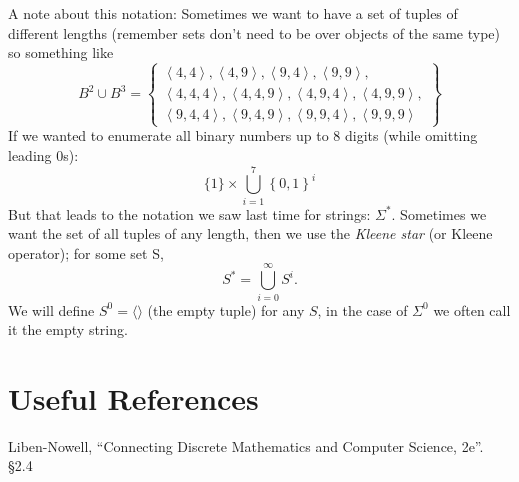 A note about this notation:
Sometimes we want to have a set of tuples of different lengths (remember sets don't need to be over objects of the same type) 
so something like 
\[
B^2 \cup B^3 = \left\{  \begin{matrix}\left\langle 4,4 \right\rangle, \left\langle 4,9 \right\rangle,  \left\langle 9,4 \right\rangle, \left\langle 9,9 \right\rangle,\\
				\left\langle 4,4,4 \right\rangle, \left\langle 4,4,9 \right\rangle,  \left\langle 4,9,4 \right\rangle, \left\langle 4,9,9 \right\rangle,\\
				\left\langle 9,4,4 \right\rangle, \left\langle 9,4,9 \right\rangle,  \left\langle 9,9,4 \right\rangle, \left\langle 9,9,9 \right\rangle \end{matrix}\right\}
\]
If we wanted to enumerate all binary numbers up to 8 digits (while omitting leading 0s):
\[
\{1\} \times \bigcup_{i=1}^7 \left\{0,1\right\}^i
\]
But that leads to the notation we saw last time for strings: $\Sigma^*$.
Sometimes we want the set of all tuples of any length, then we use the \emph{Kleene star} (or Kleene operator); 
for some set S, 
\[
S^* =  \bigcup_{i=0}^\infty S^i.
\]
We will define $S^0 = \langle\rangle$ (the empty tuple) for any $S$, in the case of $\Sigma^0$ we often call it the empty string.

\section*{Useful References}
Liben-Nowell, ``Connecting Discrete Mathematics and Computer Science, 2e''. \S 2.4


